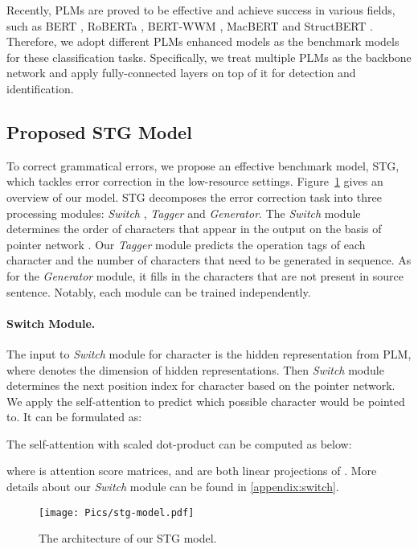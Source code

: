 \documentclass[11pt]{article}
\begin{document}
Recently, PLMs are proved to be effective and achieve success in various fields, such as BERT \cite{devlin2018bert}, RoBERTa \cite{liu2019roberta}, BERT-WWM \cite{cui2021pre}, MacBERT \cite{cui2020revisiting} and StructBERT \cite{wang2019structbert}. Therefore, we adopt different PLMs enhanced models as the benchmark models for these classification tasks. Specifically, we treat multiple PLMs as the backbone network and apply fully-connected layers on top of it for detection and identification.

\subsection{Proposed STG Model}
\label{sec:stg-model}

To correct grammatical errors, we propose an effective benchmark model, STG, which tackles error correction in the low-resource settings. Figure~\ref{fig:stg-model} gives an overview of our model. STG decomposes the error correction task into three processing modules: \emph{Switch} , \emph{Tagger} and \emph{Generator}. The \emph{Switch} module determines the order of characters that appear in the output on the basis of pointer network \cite{vinyals2015pointer}. Our \emph{Tagger} module predicts the operation tags of each character and the number of characters that need to be generated in sequence. As for the \emph{Generator} module, it fills in the characters that are not present in source sentence. Notably, each module can be trained independently.

\paragraph{Switch Module.} The input to \emph{Switch} module for character  is the hidden representation  from PLM, where  denotes the dimension of hidden representations. Then \emph{Switch} module determines the next position index for character  based on the pointer network. We apply the self-attention to predict which possible character  would be pointed to. It can be formulated as:


The self-attention with scaled dot-product can be computed as below:

where  is attention score matrices,  and  are both linear projections of . More details about our \emph{Switch} module can be found in \ref{appendix:switch}. 

\begin{figure}[t]
	\centering
	\texttt{[image: Pics/stg-model.pdf]} 
	\caption{The architecture of our STG model.}
	\label{fig:stg-model}
\end{figure}
 
\end{document}
